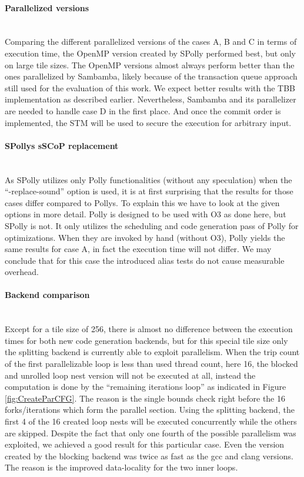 \paragraph*{Parallelized versions} ~\\
Comparing the different parallelized versions of the cases A, B and C in terms of execution time,
the OpenMP version created by SPolly performed  best, but only on large tile sizes. 
The OpenMP versions almost always perform better than the ones parallelized by Sambamba, 
likely because of the transaction queue approach still used for the evaluation of this work.
We expect better results with the TBB\cite{Corporation_2008} implementation as 
described earlier. Nevertheless, Sambamba and its parallelizer are needed to 
handle case D in the first place. And once the commit order is 
implemented, the STM will be used to secure the execution for arbitrary input.

\paragraph*{SPollys sSCoP replacement} ~\\
As SPolly utilizes only Polly functionalities (without any speculation)
when the ``-replace-sound'' option is used, it is at first surprising that the 
results for those cases differ compared to Pollys. To explain this we have to 
look at the given options in more detail. Polly is designed to be used with O3 as 
done here, but SPolly is not. It only utilizes the scheduling and code
generation pass of Polly for optimizations. 
When they are invoked by hand (without O3), 
Polly yields the same results for case A, in fact the execution time will not
differ. We may conclude that for this case 
the introduced alias tests do not cause measurable overhead. 
\\

\paragraph*{Backend comparison} ~\\
Except for a tile size of 256, there is almost no difference between the 
execution times for both new code generation backends, but for this special 
tile size only the splitting backend is currently able to exploit parallelism. 
When the trip count of the first parallelizable loop is less than used 
thread count, here 16,  the blocked and unrolled loop nest version
will not be executed at all, instead the computation is done by the ``remaining iterations loop'' as indicated in Figure \ref{fig:CreateParCFG}. The reason is the single bounds check right 
before the 16 forks/iterations which form the parallel section.
Using the splitting backend, the first 4 of the 16 created loop nests 
will be executed concurrently while the others are skipped. 
Despite the fact that only one fourth of the possible parallelism was exploited, 
we achieved a good result for this particular case. Even the version created by 
the blocking backend was twice as fast as the gcc and clang versions. The reason
is the improved data-locality for the two inner loops.


